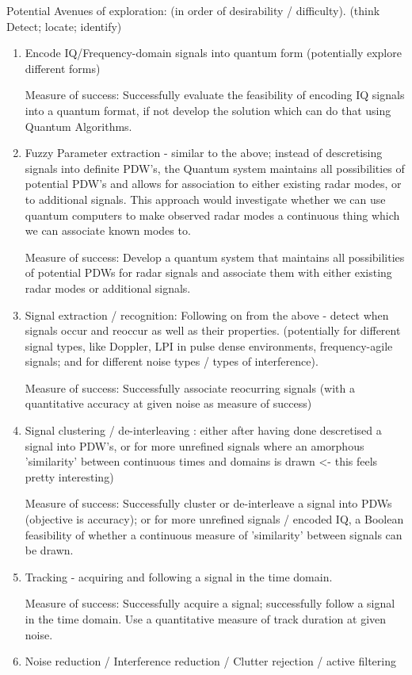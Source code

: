 Potential Avenues of exploration: (in order of desirability / difficulty). (think Detect; locate; identify)
\begin{enumerate}
    \item Encode IQ/Frequency-domain signals into quantum form (potentially explore different forms)
    
    Measure of success: Successfully evaluate the feasibility of encoding IQ signals into a quantum format, if not develop the solution which can do that using Quantum Algorithms.
    
    \item Fuzzy Parameter extraction - similar to the above; instead of descretising signals into definite PDW's, the Quantum system maintains all possibilities of potential PDW's and allows for association to either existing radar modes, or to additional signals. This approach would investigate whether we can use quantum computers to make observed radar modes a continuous thing which we can associate known modes to.
    
    Measure of success: Develop a quantum system that maintains all possibilities of potential PDWs for radar signals and associate them with either existing radar modes or additional signals. 
    
    \item Signal extraction / recognition: Following on from the above - detect when signals occur and reoccur as well as their properties. (potentially for different signal types, like Doppler, LPI in pulse dense environments, frequency-agile signals; and for different noise types / types of interference).

    Measure of success: Successfully associate reocurring signals (with a quantitative accuracy at given noise as measure of success) 
    
    \item Signal clustering / de-interleaving : either after having done descretised a signal into PDW's, or for more unrefined signals where an amorphous 'similarity' between continuous times and domains is drawn <- this feels pretty interesting)

    Measure of success: Successfully cluster or de-interleave a signal into PDWs (objective is accuracy); or for more unrefined signals / encoded IQ, a Boolean feasibility of whether a continuous measure of 'similarity' between signals can be drawn.
    
    \item Tracking - acquiring and following a signal in the time domain.

    Measure of success: Successfully acquire a signal; successfully follow a signal in the time domain. Use a quantitative measure of track duration at given noise.
    
    \item Noise reduction / Interference reduction / Clutter rejection / active filtering
\end{enumerate}
